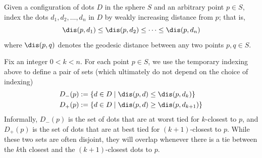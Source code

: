 \documentclass[11pt,oneside]{amsart}
\theoremstyle{definition}
\theoremstyle{remark}
\numberwithin{equation}{section}
\begin{document}







Given a configuration of dots $D$ in the sphere $S$ and an arbitrary point $p\in S$, 
index the dots $d_1,d_2,\dotsc,d_n$ in $D$ by weakly increasing distance from $p$; that is,
\[
\dis(p,d_1)\leq \dis(p,d_2) \leq \dotsb \leq \dis(p,d_n) 
\]
where $\dis(p,q)$ denotes the geodesic distance between any two points $p,q\in S$.

Fix an integer $0<k<n$. For each point $p\in S$, we use the temporary indexing above to define a pair of sets (which ultimately do not depend on the choice of indexing)
\[
\begin{aligned}
D_{-}(p)&:= \{d\in D \mid \dis(p,d) \leq \dis(p,d_k) \} \\
D_{+}(p)&:= \{d\in D \mid \dis(p,d) \geq \dis(p,d_{k+1}) \} \\
\end{aligned}
\]
Informally, $D_{-}(p)$ is the set of dots that are at worst tied for $k$-closest to $p$, and $D_{+}(p)$ is the set of dots that are at best tied for $(k+1)$-closest to $p$.
While these two sets are often disjoint, they will overlap whenever there is a tie between the $k$th closest and the $(k+1)$-closest dots to $p$.
\end{document}
